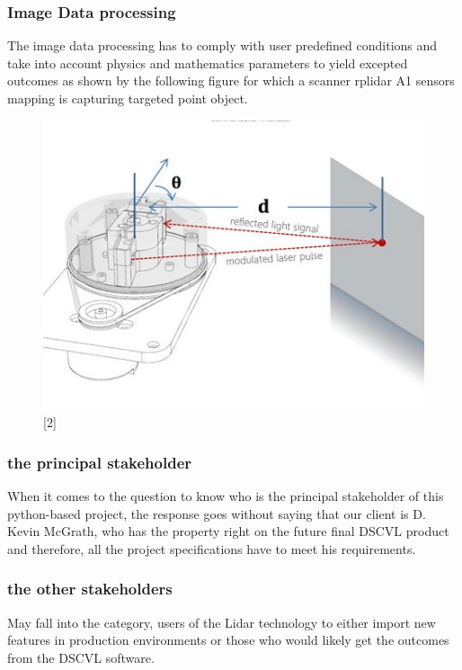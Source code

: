\documentclass[10pt,draftclsnofoot,onecolumn,journal,compsoc]{IEEEtran}
\begin{document}
    	\subsubsection{Image Data processing}
    The image data processing has to comply with user predefined conditions and take into account physics and mathematics parameters to yield excepted outcomes as  shown by the following figure for which a scanner rplidar A1 sensors mapping  is capturing targeted point object.
     \\[2ex]
    	\begin{figure}[ht]
    	 \centering \includegraphics[width=4.5in,natwidth=4000,natheight=200]{images/imageproc.jpg}
    	\label{rplidar}
    	\end{figure}
       
    	\subsubsection{the principal stakeholder}
   When it comes to the question to know who is the principal stakeholder of this python-based project, the response goes without saying that our client is D. Kevin McGrath, who has the property right on the future final DSCVL product  and therefore, all the project specifications have to meet his requirements. 
    	\subsubsection{the other stakeholders}
    	May fall into the category, users of the Lidar technology to either import new features in  production environments or those who would likely get the outcomes from the DSCVL software. 
    	
\end{document}
